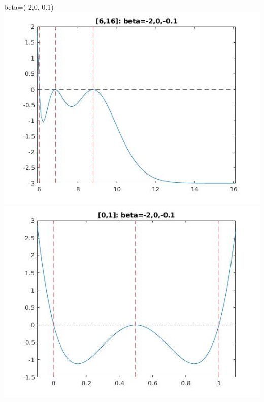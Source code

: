 \documentclass[11pt]{beamer}
\begin{document}
\begin{frame}{beta=(-2,0,-0.1)}
\includegraphics[scale=0.18]{quadplots/616_3.jpg}
\includegraphics[scale=0.18]{quadplots/01_3.jpg}
\end{frame}
\end{document}
